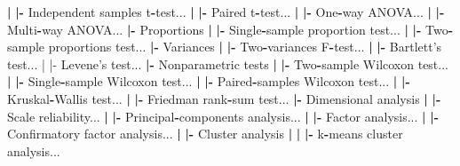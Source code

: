 \documentclass[12pt,]{krantz}
\newenvironment{Shaded}{\begin{snugshade}}{\end{snugshade}}
\newcommand{\ErrorTok}[1]{\textcolor[rgb]{0.64,0.00,0.00}{\textbf{#1}}}
\newcommand{\NormalTok}[1]{#1}
\newcommand{\OperatorTok}[1]{\textcolor[rgb]{0.81,0.36,0.00}{\textbf{#1}}}
\newcommand{\StringTok}[1]{\textcolor[rgb]{0.31,0.60,0.02}{#1}}
\begin{document}
\begin{Shaded}
\begin{Highlighting}[]
  \OperatorTok{|}\StringTok{ }\ErrorTok{|}\OperatorTok{-}\StringTok{ }\NormalTok{Independent samples t}\OperatorTok{-}\NormalTok{test...}
  \OperatorTok{|}\StringTok{ }\ErrorTok{|}\OperatorTok{-}\StringTok{ }\NormalTok{Paired t}\OperatorTok{-}\NormalTok{test...}
  \OperatorTok{|}\StringTok{ }\ErrorTok{|}\OperatorTok{-}\StringTok{ }\NormalTok{One}\OperatorTok{-}\NormalTok{way ANOVA...}
  \OperatorTok{|}\StringTok{ }\ErrorTok{|}\OperatorTok{-}\StringTok{ }\NormalTok{Multi}\OperatorTok{-}\NormalTok{way ANOVA...}
  \OperatorTok{|-}\StringTok{ }\NormalTok{Proportions}
  \OperatorTok{|}\StringTok{ }\ErrorTok{|}\OperatorTok{-}\StringTok{ }\NormalTok{Single}\OperatorTok{-}\NormalTok{sample proportion test...}
  \OperatorTok{|}\StringTok{ }\ErrorTok{|}\OperatorTok{-}\StringTok{ }\NormalTok{Two}\OperatorTok{-}\NormalTok{sample proportions test...}
  \OperatorTok{|-}\StringTok{ }\NormalTok{Variances}
  \OperatorTok{|}\StringTok{ }\ErrorTok{|}\OperatorTok{-}\StringTok{ }\NormalTok{Two}\OperatorTok{-}\NormalTok{variances F}\OperatorTok{-}\NormalTok{test...}
  \OperatorTok{|}\StringTok{ }\ErrorTok{|}\OperatorTok{-}\StringTok{ }\NormalTok{Bartlett}\StringTok{'s test...}
\StringTok{  | |- Levene'}\NormalTok{s test...}
  \OperatorTok{|-}\StringTok{ }\NormalTok{Nonparametric tests}
  \OperatorTok{|}\StringTok{ }\ErrorTok{|}\OperatorTok{-}\StringTok{ }\NormalTok{Two}\OperatorTok{-}\NormalTok{sample Wilcoxon test...}
  \OperatorTok{|}\StringTok{ }\ErrorTok{|}\OperatorTok{-}\StringTok{ }\NormalTok{Single}\OperatorTok{-}\NormalTok{sample Wilcoxon test...}
  \OperatorTok{|}\StringTok{ }\ErrorTok{|}\OperatorTok{-}\StringTok{ }\NormalTok{Paired}\OperatorTok{-}\NormalTok{samples Wilcoxon test...}
  \OperatorTok{|}\StringTok{ }\ErrorTok{|}\OperatorTok{-}\StringTok{ }\NormalTok{Kruskal}\OperatorTok{-}\NormalTok{Wallis test...}
  \OperatorTok{|}\StringTok{ }\ErrorTok{|}\OperatorTok{-}\StringTok{ }\NormalTok{Friedman rank}\OperatorTok{-}\NormalTok{sum test...}
  \OperatorTok{|-}\StringTok{ }\NormalTok{Dimensional analysis}
  \OperatorTok{|}\StringTok{ }\ErrorTok{|}\OperatorTok{-}\StringTok{ }\NormalTok{Scale reliability...}
  \OperatorTok{|}\StringTok{ }\ErrorTok{|}\OperatorTok{-}\StringTok{ }\NormalTok{Principal}\OperatorTok{-}\NormalTok{components analysis...}
  \OperatorTok{|}\StringTok{ }\ErrorTok{|}\OperatorTok{-}\StringTok{ }\NormalTok{Factor analysis...}
  \OperatorTok{|}\StringTok{ }\ErrorTok{|}\OperatorTok{-}\StringTok{ }\NormalTok{Confirmatory factor analysis...}
  \OperatorTok{|}\StringTok{ }\ErrorTok{|}\OperatorTok{-}\StringTok{ }\NormalTok{Cluster analysis}
  \OperatorTok{|}\StringTok{ }\ErrorTok{|}\StringTok{ }\ErrorTok{|}\OperatorTok{-}\StringTok{ }\NormalTok{k}\OperatorTok{-}\NormalTok{means cluster analysis...}

\end{Highlighting}
\end{Shaded}
\end{document}
